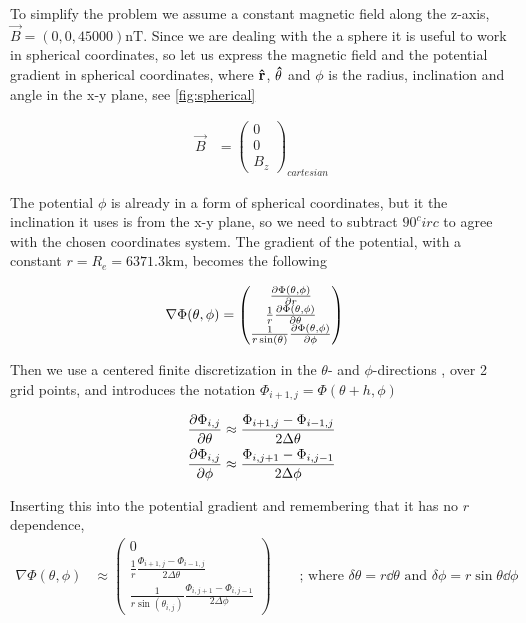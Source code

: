 \documentclass[x11names]{article}
\renewcommand{\va}{\vec}
\begin{document}
    To simplify the problem we assume a constant magnetic field along the z-axis, \(\va{B} = (0,0,45000) \si{\nano\tesla}\). Since we are dealing with the a sphere it is useful to work in spherical coordinates, so let us express the magnetic field and the potential gradient in spherical coordinates, where \(\vu{r}\), \(\vu{\theta}\) and \(\phi\) is the radius, inclination and angle in the x-y plane, see \cref{fig:spherical}

    \begin{align}
      \va{B} &= 
      \begin{pmatrix}
        0 \\ 0 \\ B_z
      \end{pmatrix}_{cartesian}
    \end{align}

    \noindent The potential \(\phi\) is already in a form of spherical coordinates, but it the inclination it uses is from the x-y plane, so we need to subtract \(90^circ\) to agree with the chosen coordinates system. The gradient of the potential, with a constant \(r = R_e = 6371.3 \si{\kilo \meter}\), becomes the following

    \begin{align}
      \nabla \Phi(\theta,\phi) &= 
      \begin{pmatrix}
        \pdv{\Phi(\theta,\phi)}{r}
        \\
        \frac{1}{r} \pdv{\Phi(\theta,\phi)}{\theta}
        \\
        \frac{1}{r\sin(\theta)} \pdv{\Phi(\theta,\phi)}{\phi}
      \end{pmatrix}
    \end{align}

    \noindent Then we use a centered finite discretization in the \(\theta\)- and \(\phi\)-directions , over 2 grid points, and introduces the notation \(\Phi_{i+1,j} = \Phi(\theta + h, \phi)\)

    \begin{align}
      \pdv{\Phi_{i,j}}{\theta} &\approx \frac{ \Phi_{i+1, j} - \Phi_{i - 1, j} }{2 \Delta \theta}
      \\
      \pdv{\Phi_{i,j}}{\phi} &\approx \frac{ \Phi_{i, j + 1} - \Phi_{i , j - 1} }{2\Delta \phi}
    \end{align}

    Inserting this into the potential gradient and remembering that it has no \(r\) dependence,
    \begin{align}
      \nabla \Phi(\theta,\phi) &\approx
      \begin{pmatrix}
        0
        \\
        \frac{1}{r} \frac{ \Phi_{i+1, j} - \Phi_{i - 1, j} }{2 \Delta \theta}
        \\
        \frac{1}{r\sin(\theta_{i,j})}  \frac{ \Phi_{i, j + 1} - \Phi_{i , j - 1} }{2\Delta \phi}
      \end{pmatrix} \label{eq:discretization}
      \qquad{} \text{; where }  \delta \theta = r\dd{\theta} \text{ and } \delta \phi = r \sin{\theta} \dd \phi 
    \end{align}
\end{document}

